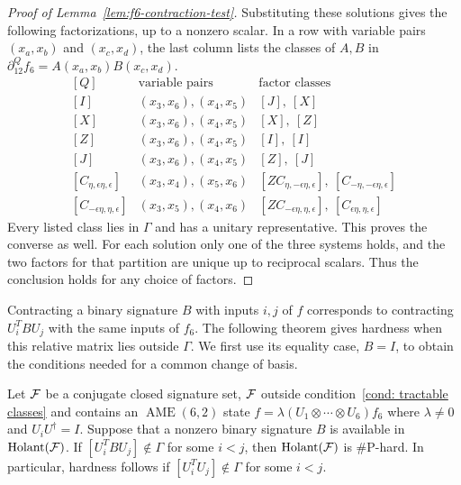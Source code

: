 \begin{proof}[Proof of Lemma~\ref{lem:f6-contraction-test}]
Substituting these solutions gives the following factorizations,
up to a nonzero scalar. In a row with variable pairs $(x_a,x_b)$
and $(x_c,x_d)$, the last column lists the classes of
$A,B$ in $\partial_{12}^Qf_6=A(x_a,x_b)B(x_c,x_d)$.
\[
\begin{array}{c|c|c}
[Q]&\text{variable pairs}&\text{factor classes}\\ \hline
{[I]}&(x_3,x_6),(x_4,x_5)&[J],\ [X]\\
{[X]}&(x_3,x_6),(x_4,x_5)&[X],\ [Z]\\
{[Z]}&(x_3,x_6),(x_4,x_5)&[I],\ [I]\\
{[J]}&(x_3,x_6),(x_4,x_5)&[Z],\ [J]\\
{[C_{\eta,\epsilon\eta,\epsilon}]}&(x_3,x_4),(x_5,x_6)&
[ZC_{\eta,-\epsilon\eta,\epsilon}],\ [C_{-\eta,-\epsilon\eta,\epsilon}]\\
{[C_{-\epsilon\eta,\eta,\epsilon}]}&(x_3,x_5),(x_4,x_6)&
[ZC_{-\epsilon\eta,\eta,\epsilon}],\ [C_{\epsilon\eta,\eta,\epsilon}]
\end{array}
\]
Every listed class lies in $\Gamma$ and has a unitary representative.
This proves the converse as well. For each solution only one of the
three systems holds, and the two factors for that partition are
unique up to reciprocal scalars. Thus the conclusion holds for
any choice of factors.

\end{proof}

Contracting a binary signature $B$ with inputs $i,j$ of $f$ corresponds
to contracting $U_i^TBU_j$ with the same inputs of $f_6$.
The following theorem gives hardness when this relative matrix lies
outside $\Gamma$. We first use its equality case, $B=I$, to obtain
the conditions needed for a common change of basis.

\begin{theorem}
\label{thm:f6-nongamma-hard}
Let $\mathcal{F}$ be a conjugate closed signature set, $\mathcal{F}$ outside condition~\eqref{cond: tractable classes} and contains an $\operatorname{AME}(6,2)$ state $f=\lambda(U_1\otimes\cdots \otimes U_6)f_6$ where $\lambda\neq 0$ and $U_iU^\dagger=I$.
Suppose that a nonzero binary signature $B$ is available in $\operatorname{Holant}(\mathcal{F})$.
If $[U_i^TBU_j]\notin\Gamma$ for some $i<j$, then
$\operatorname{Holant}(\mathcal F)$ is $\#\mathrm P$-hard.
In particular, hardness follows if $[U_i^TU_j]\notin\Gamma$ for some
$i<j$.
\end{theorem}

